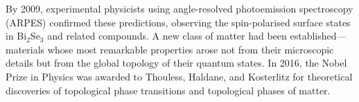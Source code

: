\begin{historical}
By 2009, experimental physicists using angle-resolved photoemission spectroscopy (ARPES) confirmed these predictions, observing the spin-polarised surface states in Bi$_2$Se$_3$ and related compounds. A new class of matter had been established—materials whose most remarkable properties arose not from their microscopic details but from the global topology of their quantum states. In 2016, the Nobel Prize in Physics was awarded to Thouless, Haldane, and Kosterlitz for theoretical discoveries of topological phase transitions and topological phases of matter.
\end{historical}
